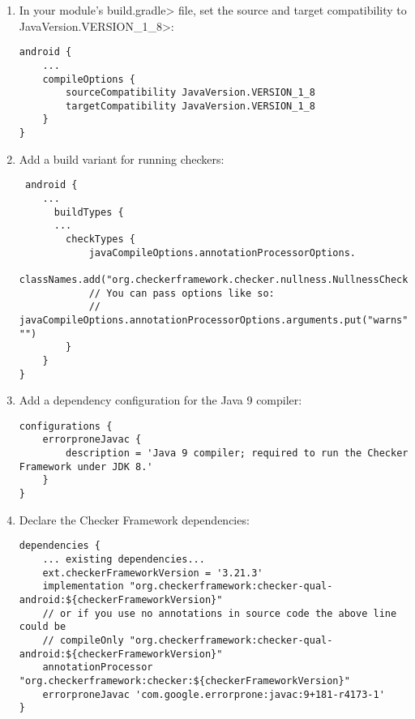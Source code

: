 \begin{enumerate}

\item In your module's \<build.gradle> file, set the source and target
  compatibility to \<JavaVersion.VERSION\_1\_8>:

\begin{Verbatim}
android {
    ...
    compileOptions {
        sourceCompatibility JavaVersion.VERSION_1_8
        targetCompatibility JavaVersion.VERSION_1_8
    }
}
\end{Verbatim}

\item Add a build variant for running checkers:

 \begin{Verbatim}
 android {
    ...
      buildTypes {
      ...
        checkTypes {
            javaCompileOptions.annotationProcessorOptions.
                    classNames.add("org.checkerframework.checker.nullness.NullnessChecker")
            // You can pass options like so:
            // javaCompileOptions.annotationProcessorOptions.arguments.put("warns", "")
        }
    }
}
\end{Verbatim}

\item Add a dependency configuration for the Java 9 compiler:

\begin{mysmall}
\begin{Verbatim}
configurations {
    errorproneJavac {
        description = 'Java 9 compiler; required to run the Checker Framework under JDK 8.'
    }
}

\end{Verbatim}
\end{mysmall}

\item Declare the Checker Framework dependencies:

\begin{mysmall}
\begin{Verbatim}
dependencies {
    ... existing dependencies...
    ext.checkerFrameworkVersion = '3.21.3'
    implementation "org.checkerframework:checker-qual-android:${checkerFrameworkVersion}"
    // or if you use no annotations in source code the above line could be
    // compileOnly "org.checkerframework:checker-qual-android:${checkerFrameworkVersion}"
    annotationProcessor "org.checkerframework:checker:${checkerFrameworkVersion}"
    errorproneJavac 'com.google.errorprone:javac:9+181-r4173-1'
}
\end{Verbatim}
\end{mysmall}


\end{enumerate}
